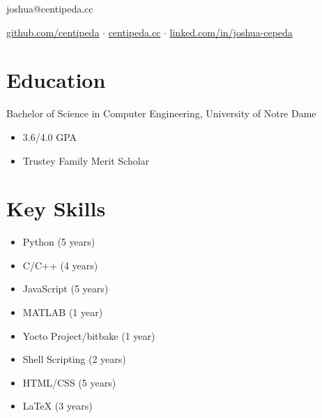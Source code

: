 \documentclass[11pt]{article}
\newcommand{\listing}[2]{#1 \hfill \strong{#2}}
\newcommand{\details}[1]{
    \vspace{-10pt}
    \begin{itemize}
        \setlength\itemsep{-4pt}
        #1
    \end{itemize}
}
\newcommand{\sect}[1]{\vspace{-20pt}\section*{#1}\vspace{-10pt}}
\begin{document}
    \begin{center}
        {\Huge {}}

        \vspace{5pt}

        joshua@centipeda.cc

        \href{https://github.com/centipeda}{github.com/centipeda} 
        $\cdot$ \href{https://centipeda.cc}{centipeda.cc} 
        $\cdot$ \href{https://linkedin.com/in/joshua-cepeda}{linked.com/in/joshua-cepeda}
    \end{center}
    \vspace{-10pt}
    \hrulefill
    \vspace{-15pt}


    \vspace{20pt}
    \sect{Education}

    \listing{Bachelor of Science in Computer Engineering, University of Notre Dame}{2018 - 2022}
    \details{
        \item 3.6/4.0 GPA
        \item Trustey Family Merit Scholar
    }


    \sect{Key Skills}
    \begin{center}\begin{minipage}{350pt}
    \begin{multicols}{2}
        \begin{itemize}
            \setlength\itemsep{-4pt}
            \item Python (5 years)
            \item C/C++ (4 years)
            \item JavaScript (5 years)
            \item MATLAB (1 year)
            \item Yocto Project/bitbake (1 year)
            \item Shell Scripting (2 years)
            \item HTML/CSS (5 years)
            \item LaTeX (3 years)
        \end{itemize}
    \end{multicols}
    \end{minipage}\end{center}
\end{document}
